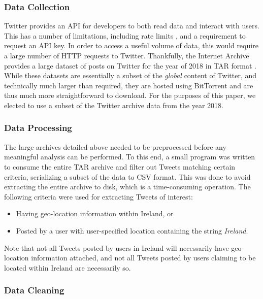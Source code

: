 \documentclass[a4paper,10pt]{article}
\begin{document}
\subsubsection{Data Collection}

Twitter provides an API for developers to both read data and interact with users. This has a number of limitations, including rate limits , and a requirement to request an API key. In order to access a useful volume of data, this would require a large number of HTTP requests to Twitter. Thankfully, the Internet Archive provides a large dataset of posts on Twitter for the year of 2018 in TAR format . While these datasets are essentially a subset of the \textit{global} content of Twitter, and technically much larger than required, they are hosted using BitTorrent and are thus much more straightforward to download. For the purposes of this paper, we elected to use a subset of the Twitter archive data from the year 2018.

\subsubsection{Data Processing}

The large archives detailed above needed to be preprocessed before any meaningful analysis can be performed. To this end, a small program was written to consume the entire TAR archive and filter out Tweets matching certain criteria, serializing a subset of the data to CSV format. This was done to avoid extracting the entire archive to disk, which is a time-consuming operation. The following criteria were used for extracting Tweets of interest:
\begin{itemize}
    \item{
        Having geo-location information within Ireland, or
    }
    \item{
        Posted by a user with user-specified location containing the string \textit{Ireland}.
    }
\end{itemize}

Note that not all Tweets posted by users in Ireland will necessarily have geo-location information attached, and not all Tweets posted by users claiming to be located within Ireland are necessarily so.

\subsubsection{Data Cleaning}
\end{document}

